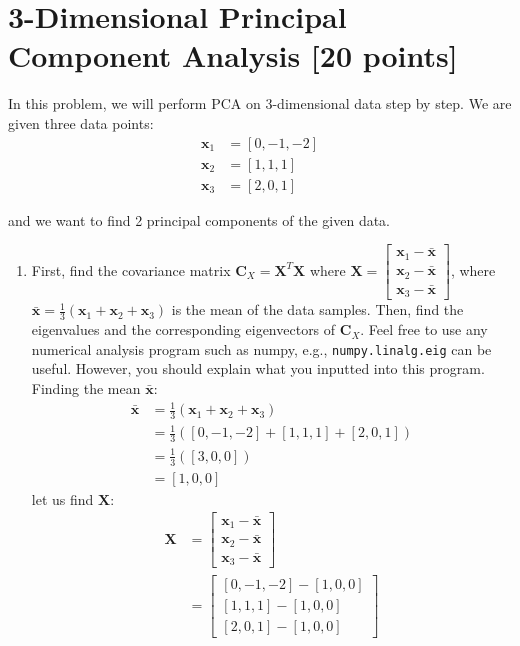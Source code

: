 \documentclass[a3paper,12pt]{extarticle} %
\begin{document}
\section{ 3-Dimensional Principal Component Analysis [20 points]}

In this problem, we will perform PCA on 3-dimensional data step by step. We are given three data points:
\begin{align}
\mathbf{x}_1 &= [0, -1, -2]\\
\mathbf{x}_2 &= [1, 1, 1]\\
\mathbf{x}_3 &= [2, 0, 1]
\end{align}

and we want to find 2 principal components of the given data.

\begin{enumerate}
\item First, find the covariance matrix $\mathbf{C}_X = \mathbf{X}^T \mathbf{X}$ where $\mathbf{X} = \begin{bmatrix} \mathbf{x}_1 - \bar{\mathbf{x}} \\ \mathbf{x}_2 - \bar{\mathbf{x}} \\ \mathbf{x}_3 - \bar{\mathbf{x}} \end{bmatrix}$, where $\bar{\mathbf{x}} = \frac{1}{3}(\mathbf{x}_1 + \mathbf{x}_2 + \mathbf{x}_3)$ is the mean of the data samples. Then, find the eigenvalues and the corresponding eigenvectors of $\mathbf{C}_X$. Feel free to use any numerical analysis program such as numpy, e.g., \texttt{numpy.linalg.eig} can be useful. However, you should explain what you inputted into this program.
\\ Finding the mean $\bar{\mathbf{x}}$:
\begin{align}
\bar{\mathbf{x}} &= \frac{1}{3}(\mathbf{x}_1 + \mathbf{x}_2 + \mathbf{x}_3)\\
&= \frac{1}{3}([0, -1, -2] + [1, 1, 1] + [2, 0, 1])\\
&= \frac{1}{3}([3, 0, 0])\\
&= [1, 0, 0]
\end{align}
let us find $\mathbf{X}$:
\begin{align}
\mathbf{X} &= \begin{bmatrix} \mathbf{x}_1 - \bar{\mathbf{x}} \\ \mathbf{x}_2 - \bar{\mathbf{x}} \\ \mathbf{x}_3 - \bar{\mathbf{x}} \end{bmatrix}\\
&= \begin{bmatrix} [0, -1, -2] - [1, 0, 0] \\ [1, 1, 1] - [1, 0, 0] \\ [2, 0, 1] - [1, 0, 0] \end{bmatrix}\\

\end{align}
\end{enumerate}
\end{document}
